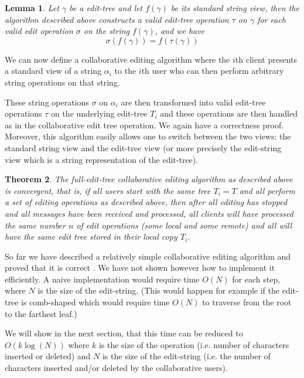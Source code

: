 \documentclass{amsart}
\newtheorem{theorem}{Theorem}[section]
\newtheorem{lemma}[theorem]{Lemma}
\begin{document}
\begin{lemma}
Let $\gamma$ be a edit-tree and let $f(\gamma)$ be its standard string view, then
the algorithm described above constructs a valid edit-tree operation $\tau$
on $\gamma$ for each valid edit operation $\sigma$ on the string $f(\gamma)$, and
we have
\[
\sigma(f(\gamma)) = f(\tau(\gamma))
\]
\end{lemma}


We can now define a
collaborative editing algorithm where the $i$th client presents 
a standard view of a
string $\alpha_i$
to the $i$th user who can then perform arbitrary string
operations on that string.

These string operations $\sigma$ on $\alpha_i$ 
are then transformed into valid edit-tree operations $\tau$
on the underlying edit-tree $T_i$ and these operations are then handled as in the
collaborative edit tree operation. We again have a correctness proof. Moreover, 
this algorithm easily allows one to switch between the two  views: 
the standard string view and the edit-tree view (or more precisely the
edit-string view which is a string representation of the edit-tree).

\begin{theorem}
The full-edit-tree collaborative editing algorithm as described above
is convergent, that is, if all users start with the same tree $T_i=T$ and
all perform a set of editing operations as described above, then after all
editing has stopped and all messages have been received and processed, all clients
will have processed the same number $n$ of edit operations (some local and
some remote) and all will have the same edit tree stored in their local copy
$T_i$.
\end{theorem}


So far we have described a relatively simple collaborative editing algorithm and
proved that it is correct . We have not shown however how
to implement it efficiently. A naive implementation would require time $O(N)$ for
each step, where $N$ is the size of the edit-string. (This would happen
for example if the edit-tree is comb-shaped which would require time $O(N)$
to traverse from the root to the farthest leaf.)

We will show in the 
next section, that this time can be reduced to $O(k\log(N))$ where $k$ is the
size of the operation (i.e. number of characters inserted or deleted) and
$N$ is the size of the edit-string (i.e. the number of characters inserted
and/or deleted by the collaborative users).
\end{document}
